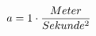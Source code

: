 \documentclass[preview]{standalone}
\begin{document}
\begin{align*}
\special{dvisvgm:raw <g id='unique000'>}a = 1 \cdot \frac{Meter}{Sekunde^{2}}\special{dvisvgm:raw </g>}
\end{align*}
\end{document}
